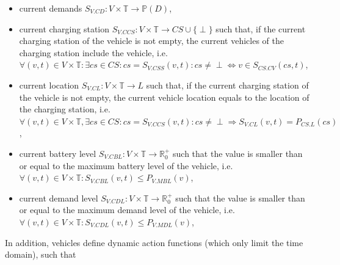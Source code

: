 \documentclass[graybox]{svmult}
\begin{document}
\begin{itemize}
	\item current demands $S_{V.CD}: V \times \mathbb{T} \rightarrow \mathbb{P}(D)$,
	\item current charging station $S_{V.CCS}: V \times \mathbb{T} \rightarrow CS \cup \{\perp\}$ such that, if the current charging station of the vehicle is not empty, the current vehicles of the charging station include the vehicle, i.e.\ $\forall (v,t) \in V \times \mathbb{T}: \exists cs \in CS: cs = S_{V.CSS}(v,t): cs \neq \perp \Leftrightarrow v \in S_{CS.CV}(cs,t)$,
	\item current location $S_{V.CL}: V \times \mathbb{T} \rightarrow L$ such that, if the current charging station of the vehicle is not empty, the current vehicle location equals to the location of the charging station, i.e.\ $\forall (v,t) \in V \times \mathbb{T}, \exists cs \in CS: cs = S_{V.CCS}(v,t): cs \neq \perp \Rightarrow S_{V.CL}(v,t)=P_{CS.L}(cs)$,
	\item current battery level $S_{V.CBL}: V \times \mathbb{T} \rightarrow \mathbb{R}_0^+$ such that the value is smaller than or equal to the maximum battery level of the vehicle, i.e.\ $\forall (v,t) \in V \times \mathbb{T}: S_{V.CBL}(v,t) \leq P_{V.MBL}(v)$,
	\item current demand level $S_{V.CDL}: V \times \mathbb{T} \rightarrow \mathbb{R}_0^+$ such that the value is smaller than or equal to the maximum demand level of the vehicle, i.e.\ $\forall (v,t) \in V \times \mathbb{T}: S_{V.CDL}(v,t) \leq P_{V.MDL}(v)$,
\end{itemize}

\noindent
In addition, vehicles define dynamic action functions (which only limit the time domain), such that
\end{document}
